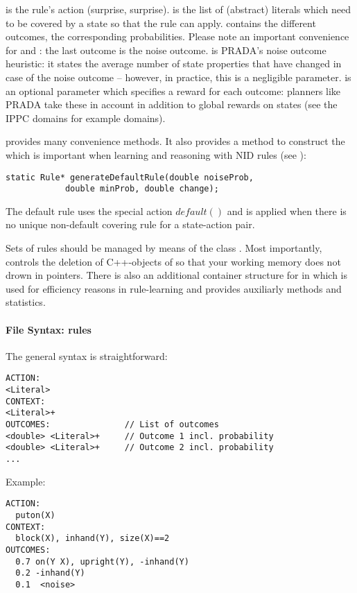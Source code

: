 \documentclass[10pt,twoside,twocolumn,fleqn]{article}
\begin{document}
 is the rule's action (surprise, surprise).  is
the list of (abstract) literals which need to be covered by a state so that
the rule can apply.  contains the different outcomes,
 the corresponding probabilities. Please note an important
convenience for  and : the last outcome is
the noise outcome.  is PRADA's noise outcome
heuristic: it states the average number of state properties that have
changed in case of the noise outcome -- however, in practice, this is a
negligible parameter.  is an optional parameter
which specifies a reward for each outcome: planners like PRADA take these
in account in addition to global rewards on states (see the IPPC domains
for example domains).

 provides many convenience methods. It also provides a method
to construct the  which is important when
learning and reasoning with NID rules (see \cite{pasula07ai}):
\begin{lstlisting}
static Rule* generateDefaultRule(double noiseProb,
			double minProb, double change);
\end{lstlisting}
The default rule uses the special action $default()$ and is applied when
there is no unique non-default covering rule for a state-action pair.

Sets of rules should be managed by means of the class . Most
importantly,  controls the deletion of C++-objects of
 so that your working memory does not drown in 
pointers. There is also an additional container structure
 for  in  which is used
for efficiency reasons in rule-learning and provides auxiliarly methods
and statistics.


\paragraph{File Syntax: rules}

The general syntax is straightforward:
\begin{lstlisting}
ACTION:
<Literal>
CONTEXT:
<Literal>+
OUTCOMES:               // List of outcomes
<double> <Literal>+     // Outcome 1 incl. probability
<double> <Literal>+     // Outcome 2 incl. probability
...
\end{lstlisting}

Example:
\begin{lstlisting}
ACTION:
  puton(X)
CONTEXT:
  block(X), inhand(Y), size(X)==2
OUTCOMES:
  0.7 on(Y X), upright(Y), -inhand(Y)
  0.2 -inhand(Y)
  0.1  <noise>
\end{lstlisting}
\end{document}
